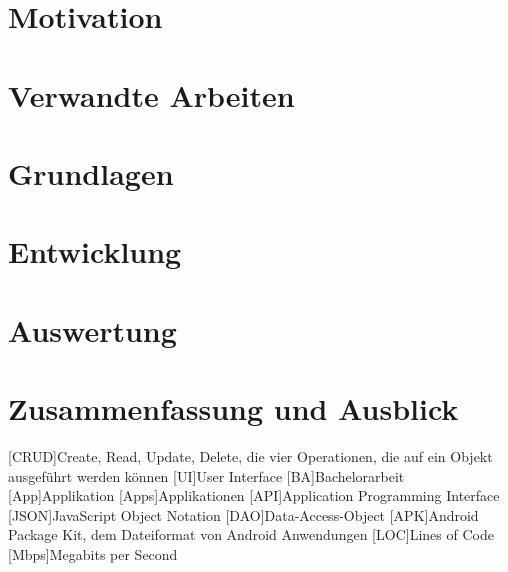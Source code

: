 \documentclass[12pt,a4paper,twosided,openany]{scrbook}
\begin{document}


\mainmatter

\chapter{Motivation}
\label{cha:1_Motivation}

\chapter{Verwandte Arbeiten}

\chapter{Grundlagen}

\chapter{Entwicklung}

\chapter{Auswertung}

\chapter{Zusammenfassung und Ausblick}




\vfill
\pagebreak

\appendix

{}
\begin{acronym}[KDE]
[CRUD]{Create, Read, Update, Delete, die vier Operationen, die auf ein Objekt ausgeführt werden können}
[UI]{User Interface}
[BA]{Bachelorarbeit}
[App]{Applikation}
[Apps]{Applikationen}
[API]{Application Programming Interface}
[JSON]{JavaScript Object Notation}
[DAO]{Data-Access-Object}
[APK]{Android Package Kit, dem Dateiformat von Android Anwendungen}
[LOC]{Lines of Code}
[Mbps]{Megabits per Second}
\end{acronym}
\vfill
\pagebreak
\end{document}
